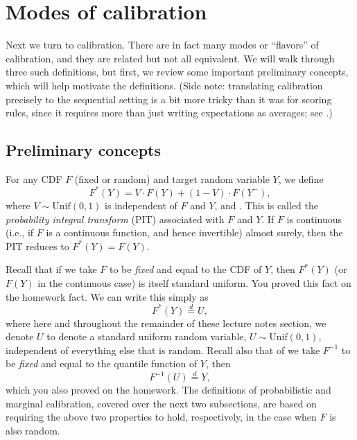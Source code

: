 \documentclass{article}
\begin{document}
\section{Modes of calibration}

Next we turn to calibration. There are in fact many modes or ``flavors'' of
calibration, and they are related but not all equivalent. We will walk through
three such definitions, but first, we review some important preliminary
concepts, which will help motivate the definitions. (Side note: translating
calibration precisely to the sequential setting is a bit more tricky than it was
for scoring rules, since it requires more than just writing expectations as 
averages; see \citet{gneiting2007probabilistic}.)        

\subsection{Preliminary concepts}

\def\deq{\overset{d}{=}}

For any CDF $F$ (fixed or random) and target random variable $Y$, we define  
\begin{equation}
\label{eq:pit}
F^*(Y) = V \cdot F(Y) + (1-V) \cdot F(Y^-),
\end{equation}
where $V \sim \mathrm{Unif}(0,1)$ is independent of $F$ and $Y$, and
. This is called the \emph{probability
  integral transform} (PIT) associated with $F$ and $Y$. If $F$ is continuous
(i.e., if $F$ is a continuous function, and hence invertible) almost surely,
then the PIT reduces to $F^*(Y) = F(Y)$.    

Recall that if we take $F$ to be \emph{fixed} and equal to the CDF of $Y$, then
$F^*(Y)$ (or $F(Y)$ in the continuous case) is itself standard uniform. You
proved this fact on the homework fact. We can write this simply as   
\[
F^*(Y) \deq U,
\]
where here and throughout the remainder of these lecture notes section, we
denote $U$ to denote a standard uniform random variable, $U \sim
\mathrm{Unif}(0,1)$, independent of everything else that is random. Recall also
that of we take $F^{-1}$ to be \emph{fixed} and equal to the quantile function
of $Y$, then  
\[
F^{-1}(U) \deq Y,
\]
which you also proved on the homework. The definitions of probabilistic and
marginal calibration, covered over the next two subsections, are based on
requiring the above two properties to hold, respectively, in the case when $F$
is also random.   
\end{document}
